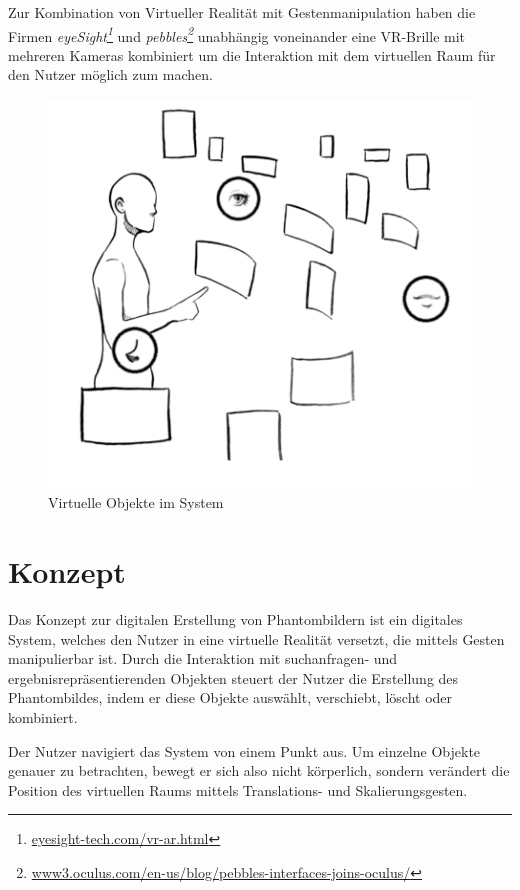 \documentclass{sigchi-ext}
\begin{document}
Zur Kombination von Virtueller Realität mit Gestenmanipulation haben die Firmen \textit{eyeSight\footnote{\url{eyesight-tech.com/vr-ar.html}}} und 
\textit{pebbles\footnote{\url{www3.oculus.com/en-us/blog/pebbles-interfaces-joins-oculus/}}} unabhängig voneinander eine VR-Brille mit mehreren Kameras kombiniert um die Interaktion mit dem virtuellen Raum für den Nutzer möglich zum machen.

\begin{figure}
  \centering
  \includegraphics[width=1\marginparwidth]{figures/system_overview}
  \caption{Virtuelle Objekte im System}
  \label{fig:systemoverview}
\end{figure}

\section{Konzept}

Das Konzept zur digitalen Erstellung von Phantombildern ist ein digitales System, welches den Nutzer in eine virtuelle Realität versetzt, die mittels Gesten manipulierbar ist. Durch die Interaktion mit suchanfragen- und ergebnisrepräsentierenden Objekten steuert der Nutzer die Erstellung des Phantombildes, indem er diese Objekte auswählt, verschiebt, löscht oder kombiniert. 

Der Nutzer navigiert das System von einem Punkt aus. Um einzelne Objekte genauer zu betrachten, bewegt er sich also nicht körperlich, sondern verändert die Position des virtuellen Raums mittels Translations- und Skalierungsgesten.
\end{document}
